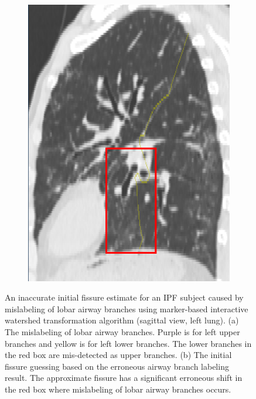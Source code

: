 {\begin{figure}[H]
\begin{subfigure}{.345\linewidth}
  \includegraphics[width=\linewidth,trim={{.0\wd0} {.0\wd0} {.0\wd0} {.0\wd0}},clip]{Segmentation/Image/YUAN_WateredFissureGuessing.png}
  \caption{}
  \label{fig:WateredAirwayMislabelled-b} 
\end{subfigure}
\caption{An inaccurate initial fissure estimate for an IPF subject caused by mislabeling of lobar airway branches using marker-based interactive watershed transformation algorithm (sagittal view, left lung). (a) The mislabeling of lobar airway branches. Purple is for left upper branches and yellow is for left lower branches. The lower branches in the red box are mis-detected as upper branches. (b) The initial fissure guessing based on the erroneous airway branch labeling result. The approximate fissure has a significant erroneous shift in the red box where mislabeling of lobar airway branches occurs.}
\label{fig:WateredAirwayMislabelled}
\end{figure}

}
